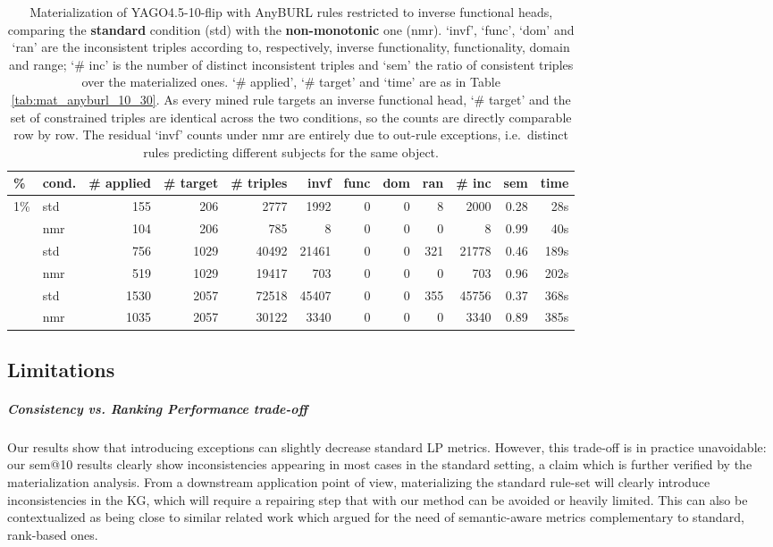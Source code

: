 \documentclass[a4paper,UKenglish,cleveref, autoref, thm-restate]{tgdk-v2021}
\begin{document}
\begin{table}[]
\centering
\scriptsize
\setlength{\tabcolsep}{4pt}
\renewcommand{\arraystretch}{1.12}
\caption{Materialization of YAGO4.5-10-flip with AnyBURL rules restricted to inverse functional heads, comparing the \textbf{standard} condition (std) with the \textbf{non-monotonic} one (nmr). `invf', `func', `dom' and `ran' are the inconsistent triples according to, respectively, inverse functionality, functionality, domain and range; `\# inc' is the number of distinct inconsistent triples and `sem' the ratio of consistent triples over the materialized ones. `\# applied', `\# target' and `time' are as in Table \ref{tab:mat_anyburl_10_30}. As every mined rule targets an inverse functional head, `\# target' and the set of constrained triples are identical across the two conditions, so the counts are directly comparable row by row. The residual `invf' counts under nmr are entirely due to out-rule exceptions, i.e.\ distinct rules predicting different subjects for the same object.}
\label{tab:mat_flip}
\begin{tabular}{l l | r r r r r r r r r r}
\toprule
\% & cond. & \# applied & \# target & \# triples & invf & func & dom & ran & \# inc & sem & time \\
\midrule
\multicolumn{1}{l}{1\%}  & std & 155  & 206  & 2777  & 1992  & 0 & 0 & 8   & 2000  & 0.28 & 28s \\
                         & nmr & 104  & 206  & 785   & 8     & 0 & 0 & 0   & 8     & 0.99 & 40s \\
\addlinespace
\multicolumn{1}{l}{5\%}  & std & 756  & 1029 & 40492 & 21461 & 0 & 0 & 321 & 21778 & 0.46 & 189s \\
                         & nmr & 519  & 1029 & 19417 & 703   & 0 & 0 & 0   & 703   & 0.96 & 202s \\
\addlinespace
\multicolumn{1}{l}{10\%} & std & 1530 & 2057 & 72518 & 45407 & 0 & 0 & 355 & 45756 & 0.37 & 368s \\
                         & nmr & 1035 & 2057 & 30122 & 3340  & 0 & 0 & 0   & 3340  & 0.89 & 385s \\
\bottomrule
\end{tabular}
\end{table}

\subsection{Limitations}
\subparagraph{Consistency vs. Ranking Performance trade-off} Our results show that introducing exceptions can slightly decrease standard LP metrics. However, this trade-off is in practice unavoidable: our sem@10 results clearly show inconsistencies appearing in most cases in the standard setting, a claim which is further verified by the materialization analysis. From a downstream application point of view, materializing the standard rule-set will clearly introduce inconsistencies in the KG, which will require a repairing step that with our method can be avoided or heavily limited. This can also be contextualized as being close to similar related work \cite{hubert_treat_2024,paulheim_make_2018} which argued for the need of semantic-aware metrics complementary to standard, rank-based ones.
\end{document}
